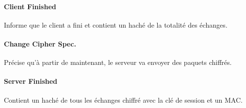 \paragraph{Client Finished}
Informe que le client a fini et contient un haché de la totalité des échanges. 
\paragraph{Change Cipher Spec.}
Précise qu'à partir de maintenant, le serveur va envoyer des paquets chiffrés. 
\paragraph{Server Finished}
Contient un haché de tous les échanges chiffré avec la clé de session et un MAC.